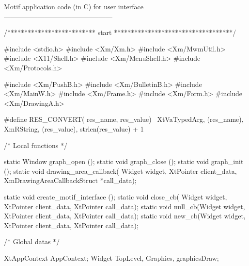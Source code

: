 Motif application code (in C) for user interface
------------------------------------------------

/**************************  start  ***********************************/

#include <stdio.h>
#include <Xm/Xm.h>
#include <Xm/MwmUtil.h>
#include <X11/Shell.h>
#include <Xm/MenuShell.h>
#include <Xm/Protocols.h>

#include <Xm/PushB.h>
#include <Xm/BulletinB.h>
#include <Xm/MainW.h>
#include <Xm/Frame.h>
#include <Xm/Form.h>
#include <Xm/DrawingA.h>

#define RES_CONVERT( res_name, res_value) \
        XtVaTypedArg, (res_name), XmRString, (res_value), strlen(res_value) + 1


/* Local functions */

static Window graph_open ();
static void graph_close ();
static void graph_init ();
static void drawing_area_callback( Widget widget, XtPointer client_data,
                                   XmDrawingAreaCallbackStruct *call_data);


static void create_motif_interface ();
static void close_cb( Widget widget, XtPointer client_data,
                      XtPointer call_data);
static void null_cb(Widget widget, XtPointer client_data,
                    XtPointer call_data);
static void new_cb(Widget widget, XtPointer client_data,
                   XtPointer call_data);


/* Global datas */

XtAppContext AppContext;
Widget TopLevel, Graphics, graphicsDraw;


